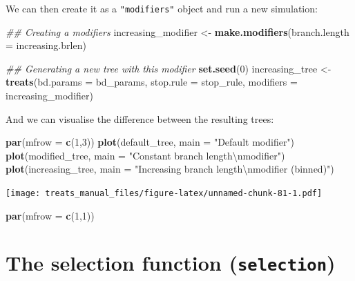 \documentclass[
]{book}
\newenvironment{Shaded}{\begin{snugshade}}{\end{snugshade}}
\newcommand{\CharTok}[1]{\textcolor[rgb]{0.31,0.60,0.02}{#1}}
\newcommand{\CommentTok}[1]{\textcolor[rgb]{0.56,0.35,0.01}{\textit{#1}}}
\newcommand{\DataTypeTok}[1]{\textcolor[rgb]{0.13,0.29,0.53}{#1}}
\newcommand{\DecValTok}[1]{\textcolor[rgb]{0.00,0.00,0.81}{#1}}
\newcommand{\KeywordTok}[1]{\textcolor[rgb]{0.13,0.29,0.53}{\textbf{#1}}}
\newcommand{\NormalTok}[1]{#1}
\newcommand{\StringTok}[1]{\textcolor[rgb]{0.31,0.60,0.02}{#1}}
\begin{document}
We can then create it as a \texttt{"modifiers"} object and run a new simulation:

\begin{Shaded}
\begin{Highlighting}[]
\CommentTok{\#\# Creating a modifiers}
\NormalTok{increasing\_modifier \textless{}{-}}\StringTok{ }\KeywordTok{make.modifiers}\NormalTok{(}\DataTypeTok{branch.length =}\NormalTok{ increasing.brlen)}

\CommentTok{\#\# Generating a new tree with this modifier}
\KeywordTok{set.seed}\NormalTok{(}\DecValTok{0}\NormalTok{)}
\NormalTok{increasing\_tree \textless{}{-}}\StringTok{ }\KeywordTok{treats}\NormalTok{(}\DataTypeTok{bd.params =}\NormalTok{ bd\_params,}
                          \DataTypeTok{stop.rule =}\NormalTok{ stop\_rule,}
                          \DataTypeTok{modifiers =}\NormalTok{ increasing\_modifier)}
\end{Highlighting}
\end{Shaded}

And we can visualise the difference between the resulting trees:

\begin{Shaded}
\begin{Highlighting}[]
\KeywordTok{par}\NormalTok{(}\DataTypeTok{mfrow =} \KeywordTok{c}\NormalTok{(}\DecValTok{1}\NormalTok{,}\DecValTok{3}\NormalTok{))}
\KeywordTok{plot}\NormalTok{(default\_tree,    }\DataTypeTok{main =} \StringTok{"Default modifier"}\NormalTok{)}
\KeywordTok{plot}\NormalTok{(modified\_tree,   }\DataTypeTok{main =} \StringTok{"Constant branch length}\CharTok{\textbackslash{}n}\StringTok{modifier"}\NormalTok{)}
\KeywordTok{plot}\NormalTok{(increasing\_tree, }\DataTypeTok{main =} \StringTok{"Increasing branch length}\CharTok{\textbackslash{}n}\StringTok{modifier (binned)"}\NormalTok{)}
\end{Highlighting}
\end{Shaded}

\texttt{[image: treats\_manual\_files/figure-latex/unnamed-chunk-81-1.pdf]}

\begin{Shaded}
\begin{Highlighting}[]
\KeywordTok{par}\NormalTok{(}\DataTypeTok{mfrow =} \KeywordTok{c}\NormalTok{(}\DecValTok{1}\NormalTok{,}\DecValTok{1}\NormalTok{))}
\end{Highlighting}
\end{Shaded}

\hypertarget{the-selection-function-selection}{%
\section{\texorpdfstring{The selection function (\texttt{selection})}{The selection function (selection)}}\label{the-selection-function-selection}}
\end{document}
